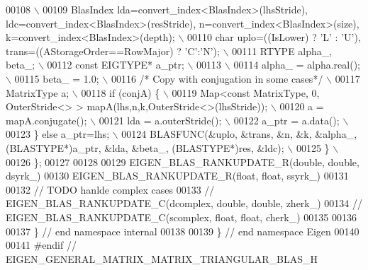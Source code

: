 \begin{DoxyCode}
00108 \textcolor{preprocessor}{\(\backslash\)}
00109 \textcolor{preprocessor}{   BlasIndex lda=convert\_index<BlasIndex>(lhsStride), ldc=convert\_index<BlasIndex>(resStride),
       n=convert\_index<BlasIndex>(size), k=convert\_index<BlasIndex>(depth); \(\backslash\)}
00110 \textcolor{preprocessor}{   char uplo=((IsLower) ? 'L' : 'U'), trans=((AStorageOrder==RowMajor) ? 'C':'N'); \(\backslash\)}
00111 \textcolor{preprocessor}{   RTYPE alpha\_, beta\_; \(\backslash\)}
00112 \textcolor{preprocessor}{   const EIGTYPE* a\_ptr; \(\backslash\)}
00113 \textcolor{preprocessor}{\(\backslash\)}
00114 \textcolor{preprocessor}{   alpha\_ = alpha.real(); \(\backslash\)}
00115 \textcolor{preprocessor}{   beta\_ = 1.0; \(\backslash\)}
00116 \textcolor{preprocessor}{}\textcolor{comment}{/* Copy with conjugation in some cases*/}\textcolor{preprocessor}{ \(\backslash\)}
00117 \textcolor{preprocessor}{   MatrixType a; \(\backslash\)}
00118 \textcolor{preprocessor}{   if (conjA) \{ \(\backslash\)}
00119 \textcolor{preprocessor}{     Map<const MatrixType, 0, OuterStride<> > mapA(lhs,n,k,OuterStride<>(lhsStride)); \(\backslash\)}
00120 \textcolor{preprocessor}{     a = mapA.conjugate(); \(\backslash\)}
00121 \textcolor{preprocessor}{     lda = a.outerStride(); \(\backslash\)}
00122 \textcolor{preprocessor}{     a\_ptr = a.data(); \(\backslash\)}
00123 \textcolor{preprocessor}{   \} else a\_ptr=lhs; \(\backslash\)}
00124 \textcolor{preprocessor}{   BLASFUNC(&uplo, &trans, &n, &k, &alpha\_, (BLASTYPE*)a\_ptr, &lda, &beta\_, (BLASTYPE*)res, &ldc); \(\backslash\)}
00125 \textcolor{preprocessor}{  \} \(\backslash\)}
00126 \textcolor{preprocessor}{\};}
00127 
00128 
00129 EIGEN\_BLAS\_RANKUPDATE\_R(\textcolor{keywordtype}{double}, \textcolor{keywordtype}{double}, dsyrk\_)
00130 EIGEN\_BLAS\_RANKUPDATE\_R(\textcolor{keywordtype}{float},  \textcolor{keywordtype}{float},  ssyrk\_)
00131 
00132 \textcolor{comment}{// TODO hanlde complex cases}
00133 \textcolor{comment}{// EIGEN\_BLAS\_RANKUPDATE\_C(dcomplex, double, double, zherk\_)}
00134 \textcolor{comment}{// EIGEN\_BLAS\_RANKUPDATE\_C(scomplex, float,  float, cherk\_)}
00135 
00136 
00137 \} \textcolor{comment}{// end namespace internal}
00138 
00139 \} \textcolor{comment}{// end namespace Eigen}
00140 
00141 \textcolor{preprocessor}{#endif // EIGEN\_GENERAL\_MATRIX\_MATRIX\_TRIANGULAR\_BLAS\_H}
\end{DoxyCode}
